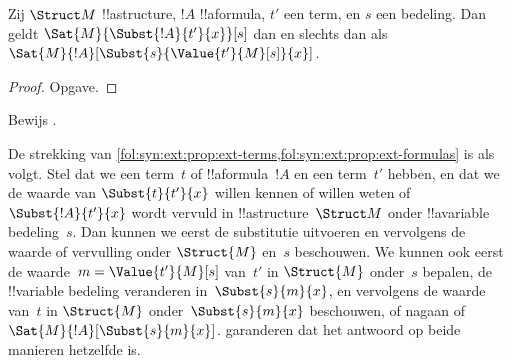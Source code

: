 \documentclass[openany]{memoir}
\begin{document}
\begin{prop} Zij $\Struct M$
!!a{structure}, $!A$ !!a{formula}, $t'$ een term, en $s$ een bedeling.
Dan geldt $\Sat{M}{\Subst{!A}{t'}{x}}[s]$ dan en slechts dan als
$\Sat{M}{!A}[\Subst{s}{\Value{t'}{M}[s]}{x}]$.
\end{prop}

\begin{proof}
Opgave.
\end{proof}

\begin{prob}
Bewijs .
\end{prob}

\begin{explain}
  De strekking van
  \cref{fol:syn:ext:prop:ext-terms,fol:syn:ext:prop:ext-formulas} is
  als volgt. Stel dat we een term~$t$ of !!a{formula}~$!A$ en een
  term~$t'$ hebben, en dat we de waarde van $\Subst{t}{t'}{x}$ willen
  kennen of willen weten of $\Subst{!A}{t'}{x}$ wordt vervuld in
  !!a{structure}~$\Struct M$ onder !!a{variable} bedeling~$s$.
  Dan kunnen we eerst de substitutie uitvoeren en vervolgens de
  waarde of vervulling onder $\Struct{M}$ en~$s$ beschouwen. We kunnen
  ook eerst de waarde~$m = \Value{t'}{M}[s]$ van~$t'$ in
  $\Struct{M}$ onder~$s$ bepalen, de !!{variable} bedeling veranderen
  in~$\Subst{s}{m}{x}$, en vervolgens de waarde van~$t$ in
  $\Struct{M}$ onder~$\Subst{s}{m}{x}$ beschouwen, of nagaan of
  $\Sat{M}{!A}[\Subst{s}{m}{x}]$.
  garanderen dat het antwoord op beide manieren hetzelfde is.
\end{explain}
\endgroup

\begingroup
\def\olfilename{OLP-0166}
\def\olfilepath{content/first-order-logic/syntax-and-semantics/}
\hypertarget{unit-OLP-0166}{}



\end{document}
